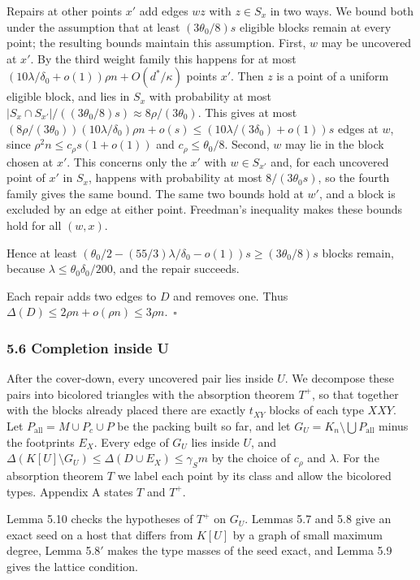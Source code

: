 \documentclass[english,11pt,a4paper]{article}
\begin{document}
Repairs at other points \(x'\) add edges \(wz\) with \(z\in S_x\) in two ways. We bound both under the assumption that at least \((3\theta_0/8)s\) eligible blocks remain at every point; the resulting bounds maintain this assumption. First, \(w\) may be uncovered at \(x'\). By the third weight family this happens for at most \((10\lambda/\delta_0+o(1))\rho n+O(d^*/\kappa)\) points \(x'\). Then \(z\) is a point of a uniform eligible block, and lies in \(S_x\) with probability at most \(|S_x\cap S_{x'}|/((3\theta_0/8)s)\approx8\rho/(3\theta_0)\). This gives at most \((8\rho/(3\theta_0))(10\lambda/\delta_0)\rho n+o(s)\le(10\lambda/(3\delta_0)+o(1))s\) edges at \(w\), since \(\rho^2n\le c_\rho s(1+o(1))\) and \(c_\rho\le\theta_0/8\). Second, \(w\) may lie in the block chosen at \(x'\). This concerns only the \(x'\) with \(w\in S_{x'}\) and, for each uncovered point of \(x'\) in \(S_x\), happens with probability at most \(8/(3\theta_0s)\), so the fourth family gives the same bound. The same two bounds hold at \(w'\), and a block is excluded by an edge at either point. Freedman's inequality makes these bounds hold for all \((w,x)\).

Hence at least \((\theta_0/2-(55/3)\lambda/\delta_0-o(1))s\ge(3\theta_0/8)s\) blocks remain, because \(\lambda\le\theta_0\delta_0/200\), and the repair succeeds.

Each repair adds two edges to \(D\) and removes one. Thus \(\Delta(D)\le2\rho n+o(\rho n)\le3\rho n\).~\(\square\)

\subsubsection{5.6 Completion inside U}\label{completion-inside-u}

After the cover-down, every uncovered pair lies inside \(U\). We decompose these pairs into bicolored triangles with the absorption theorem \(T^+\), so that together with the blocks already placed there are exactly \(t_{XY}\) blocks of each type \(XXY\). Let \(P_{\mathrm{all}}=M\cup P_c\cup P\) be the packing built so far, and let \(G_U=K_n\setminus\bigcup P_{\mathrm{all}}\) minus the footprints \(E_X\). Every edge of \(G_U\) lies inside \(U\), and \(\Delta(K[U]\setminus G_U)\le\Delta(D\cup E_X)\le\gamma_Sm\) by the choice of \(c_\rho\) and \(\lambda\). For the absorption theorem \(T\) we label each point by its class and allow the bicolored types. Appendix A states \(T\) and \(T^+\).

Lemma 5.10 checks the hypotheses of \(T^+\) on \(G_U\). Lemmas 5.7 and 5.8 give an exact seed on a host that differs from \(K[U]\) by a graph of small maximum degree, Lemma 5.8\('\) makes the type masses of the seed exact, and Lemma 5.9 gives the lattice condition.
\end{document}
